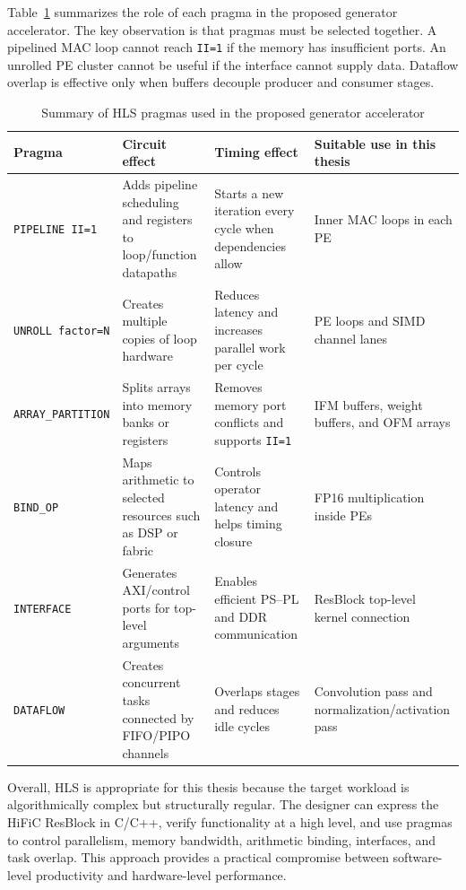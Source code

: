 Table~\ref{tab:hls_pragmas_summary} summarizes the role of each pragma in the proposed generator accelerator. The key observation is that pragmas must be selected together. A pipelined MAC loop cannot reach \texttt{II=1} if the memory has insufficient ports. An unrolled PE cluster cannot be useful if the interface cannot supply data. Dataflow overlap is effective only when buffers decouple producer and consumer stages.

\begin{table}[H]
\centering
\caption{Summary of HLS pragmas used in the proposed generator accelerator}
\label{tab:hls_pragmas_summary}
\begin{tabularx}{\textwidth}{|>{\raggedright\arraybackslash}p{}|X|X|X|}
\hline
\textbf{Pragma} & \textbf{Circuit effect} & \textbf{Timing effect} & \textbf{Suitable use in this thesis} \\
\hline
\texttt{PIPELINE II=1} & Adds pipeline scheduling and registers to loop/function datapaths & Starts a new iteration every cycle when dependencies allow & Inner MAC loops in each PE \\
\hline
\texttt{UNROLL factor=N} & Creates multiple copies of loop hardware & Reduces latency and increases parallel work per cycle & PE loops and SIMD channel lanes \\
\hline
\texttt{ARRAY\_PARTITION} & Splits arrays into memory banks or registers & Removes memory port conflicts and supports \texttt{II=1} & IFM buffers, weight buffers, and OFM arrays \\
\hline
\texttt{BIND\_OP} & Maps arithmetic to selected resources such as DSP or fabric & Controls operator latency and helps timing closure & FP16 multiplication inside PEs \\
\hline
\texttt{INTERFACE} & Generates AXI/control ports for top-level arguments & Enables efficient PS--PL and DDR communication & ResBlock top-level kernel connection \\
\hline
\texttt{DATAFLOW} & Creates concurrent tasks connected by FIFO/PIPO channels & Overlaps stages and reduces idle cycles & Convolution pass and normalization/activation pass \\
\hline
\end{tabularx}
\end{table}

Overall, HLS is appropriate for this thesis because the target workload is algorithmically complex but structurally regular. The designer can express the HiFiC ResBlock in C/C++, verify functionality at a high level, and use pragmas to control parallelism, memory bandwidth, arithmetic binding, interfaces, and task overlap. This approach provides a practical compromise between software-level productivity and hardware-level performance.


